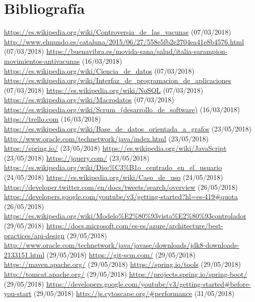 \documentclass[11pt,a4paper]{article}
\begin{document}
\section{Bibliografía}
\bigskip

\begin{thebibliography}{0}
   \url{https://es.wikipedia.org/wiki/Controversia_de_las_vacunas} (07/03/2018)
   \url{http://www.elmundo.es/cataluna/2015/06/27/558e5fb2e2704ea41e8b4576.html} (07/03/2018)
   \url{https://buenavibra.es/movida-sana/salud/italia-sarampion-movimientos-antivacunas} (16/03/2018)
   \url{https://es.wikipedia.org/wiki/Ciencia_de_datos} (07/03/2018)
   \url{https://es.wikipedia.org/wiki/Interfaz_de_programacion_de_aplicaciones} (07/03/2018)
   \url{https://es.wikipedia.org/wiki/NoSQL} (07/03/2018)
   \url{https://es.wikipedia.org/wiki/Macrodatos} (07/03/2018)
   \url{https://es.wikipedia.org/wiki/Scrum_(desarrollo_de_software)} (16/03/2018)
   \url{https://trello.com} (16/03/2018)
   \url{https://es.wikipedia.org/wiki/Base_de_datos_orientada_a_grafos} (23/05/2018)
   \url{http://www.oracle.com/technetwork/java/index.html} (23/05/2018)
   \url{https://spring.io/} (23/05/2018)
   \url{https://es.wikipedia.org/wiki/JavaScript} (23/05/2018)
   \url{https://jquery.com/} (23/05/2018)
   \url{https://es.wikipedia.org/wiki/Dise%C3%B1o_centrado_en_el_usuario} (24/05/2018)
   \url{https://es.wikipedia.org/wiki/Caso_de_uso} (24/05/2018) 
   \url{https://developer.twitter.com/en/docs/tweets/search/overview} (26/05/2018) 
   \url{https://developers.google.com/youtube/v3/getting-started?hl=es-419#quota} (26/05/2018) 
   \url{https://es.wikipedia.org/wiki/Modelo%E2%80%93vista%E2%80%93controlador} (29/05/2018) 
   \url{https://docs.microsoft.com/es-es/azure/architecture/best-practices/api-design} (29/05/2018) 
   \url{http://www.oracle.com/technetwork/java/javase/downloads/jdk8-downloads-2133151.html} (29/05/2018) 
   \url{https://git-scm.com/} (29/05/2018) 
   \url{https://maven.apache.org/} (29/05/2018) 
   \url{https://spring.io/tools} (29/05/2018) 
   \url{http://tomcat.apache.org/} (29/05/2018) 
   \url{https://projects.spring.io/spring-boot/} (29/05/2018) 
   \url{https://developers.google.com/youtube/v3/getting-started#before-you-start} (29/05/2018) 
   \url{http://js.cytoscape.org/#performance} (31/05/2018) 

\end{thebibliography}
\end{document}
